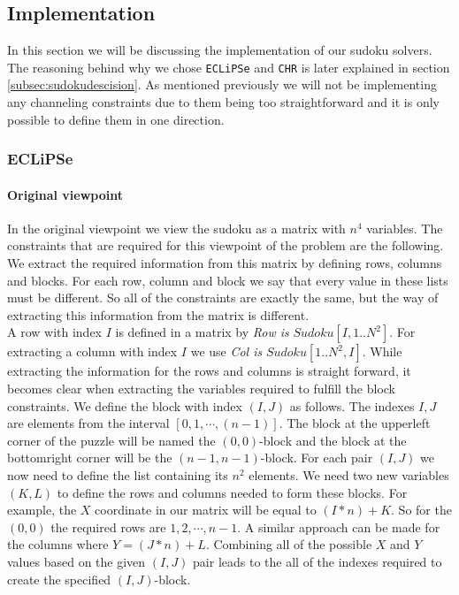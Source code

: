 \subsection{Implementation}

In this section we will be discussing the implementation of our sudoku solvers.
The reasoning behind why we chose \texttt{ECLiPSe} and \texttt{CHR} is later explained in section \ref{subsec:sudokudescision}.
As mentioned previously we will not be implementing any channeling constraints due to them being too straightforward and it is only possible to define them in one direction.

\subsubsection{ECLiPSe}
\paragraph*{Original viewpoint}
In the original viewpoint we view the sudoku as a matrix with $n^{4}$ variables.
The constraints that are required for this viewpoint of the problem are the following.
We extract the required information from this matrix by defining rows, columns and blocks.
For each row, column and block we say that every value in these lists must be different.
So all of the constraints are exactly the same, but the way of extracting this information from the matrix is different.\\

A row with index $I$ is defined in a matrix by \textit{Row is} $Sudoku[I,1..N^{2}]$. 
For extracting a column with index $I$ we use \textit{Col is } $Sudoku[1..N^{2},I]$.
While extracting the information for the rows and columns is straight forward, it becomes clear when extracting the variables required to fulfill the block constraints.
We define the block with index $(I,J)$ as follows. 
The indexes $I, J$ are elements from the interval $[0,1,\cdots,(n-1)]$.
The block at the upperleft corner of the puzzle will be named the $(0,0)$-block and the block at the bottomright corner will be the $(n-1,n-1)$-block.
For each pair $(I,J)$ we now need to define the list containing its $n^{2}$ elements.
We need two new variables $(K,L)$ to define the rows and columns needed to form these blocks.
For example, the $X$ coordinate in our matrix will be equal to $(I*n)+K$. 
So for the $(0,0)$ the required rows are $1,2,\cdots,n-1$.
A similar approach can be made for the columns where $Y = (J*n)+L$.
Combining all of the possible $X$ and $Y$ values based on the given $(I,J)$ pair leads to the all of the indexes required to create the specified $(I,J)$-block.

